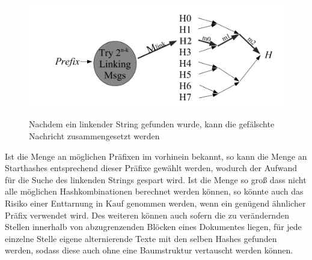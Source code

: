 \documentclass[a4paper,12pt,leqno]{article}
\begin{document}
\begin{figure}[h!]
\centering
\includegraphics[scale=0.6]{Grafiken/HerdingAttack2_Linking.png}
\label{png:herdinglinking}
\caption{Nachdem ein linkender String gefunden wurde, kann die gefälschte Nachricht zusammengesetzt werden}
\end{figure}
Ist die Menge an möglichen Präfixen im vorhinein bekannt, so kann die Menge an Starthashes entsprechend dieser Präfixe gewählt werden, wodurch der Aufwand für die Suche des linkenden Strings gespart wird. Ist die Menge so groß dass nicht alle möglichen Hashkombinationen berechnet werden können, so könnte auch das Risiko einer Enttarnung in Kauf genommen werden, wenn ein genügend ähnlicher Präfix verwendet wird. Des weiteren können auch sofern die zu verändernden Stellen innerhalb von abzugrenzenden Blöcken eines Dokumentes liegen, für jede einzelne Stelle eigene alternierende Texte mit den selben Hashes gefunden werden, sodass diese auch ohne eine Baumstruktur vertauscht werden können.
\end{document}
